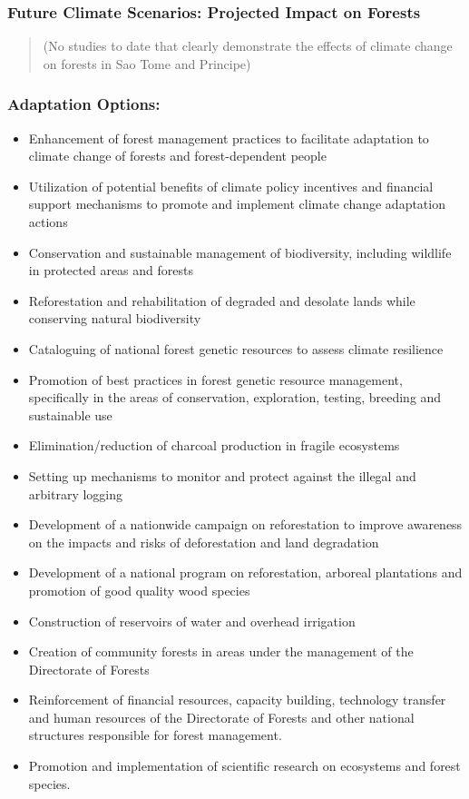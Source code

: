 \documentclass[
]{book}
\providecommand{\tightlist}{%
  \setlength{\itemsep}{0pt}\setlength{\parskip}{0pt}}
\begin{document}
\hypertarget{future-climate-scenarios-projected-impact-on-forests}{%
\subsubsection{Future Climate Scenarios: Projected Impact on Forests}\label{future-climate-scenarios-projected-impact-on-forests}}

\begin{quote}
(No studies to date that clearly demonstrate the effects of climate change on forests in Sao Tome and Principe)
\end{quote}

\hypertarget{adaptation-options-5}{%
\subsubsection{Adaptation Options:}\label{adaptation-options-5}}

\begin{itemize}
\tightlist
\item
  Enhancement of forest management practices to facilitate adaptation to climate change of forests and forest-dependent people
\item
  Utilization of potential benefits of climate policy incentives and financial support mechanisms to promote and implement climate change adaptation actions
\item
  Conservation and sustainable management of biodiversity, including wildlife in protected areas and forests
\item
  Reforestation and rehabilitation of degraded and desolate lands while conserving natural biodiversity
\item
  Cataloguing of national forest genetic resources to assess climate resilience
\item
  Promotion of best practices in forest genetic resource management, specifically in the areas of conservation, exploration, testing, breeding and sustainable use
\item
  Elimination/reduction of charcoal production in fragile ecosystems
\item
  Setting up mechanisms to monitor and protect against the illegal and arbitrary logging
\item
  Development of a nationwide campaign on reforestation to improve awareness on the impacts and risks of deforestation and land degradation
\item
  Development of a national program on reforestation, arboreal plantations and promotion of good quality wood species
\item
  Construction of reservoirs of water and overhead irrigation
\item
  Creation of community forests in areas under the management of the Directorate of Forests
\item
  Reinforcement of financial resources, capacity building, technology transfer and human resources of the Directorate of Forests and other national structures responsible for forest management.
\item
  Promotion and implementation of scientific research on ecosystems and forest species.
\end{itemize}
\end{document}
